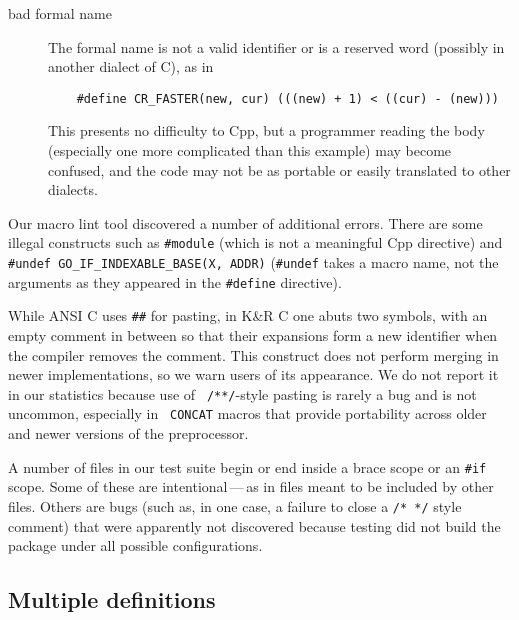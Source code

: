 \documentclass[10pt]{article}
\begin{document}
\begin{description}
\item[bad formal name]
        The formal name is not a valid identifier or is a reserved word
        (possibly in another dialect of C), as in
\begin{verbatim}
    #define CR_FASTER(new, cur) (((new) + 1) < ((cur) - (new)))
\end{verbatim}
        This presents no difficulty to Cpp, but a programmer reading the
        body (especially one more complicated than this example) may become
        confused, and the code may not be as portable or easily translated
        to other dialects. 

\end{description}


Our macro lint tool discovered a number of additional
errors.  There are some illegal constructs such as {\tt \#module} (which
is not a meaningful Cpp directive) and {\tt \#undef
\verb|GO_IF_INDEXABLE_BASE|(X, ADDR)} ({\tt \#undef} takes a macro name,
not the arguments as they appeared in the {\tt \#define} directive).
  
While ANSI C uses {\tt \#\#} for pasting, in K\&R C one abuts two symbols,
with an empty comment in between so that their expansions form a new
identifier when the compiler removes the comment.  This construct does not
perform merging in newer implementations, so we warn users of its
appearance.  We do not report it in our statistics because use of {\tt
/**/}-style pasting is rarely a bug and is not uncommon, especially in {\tt
CONCAT} macros that provide portability across older and newer versions of
the preprocessor.

A number of files in our test suite begin or end inside a brace scope or an
{\tt \#if} scope.  Some of these are intentional\,---\,as in files meant to
be included by other files.  Others are bugs (such as, in one case, a
failure to close a {\tt /* */} style comment) that were apparently not
discovered because testing did not build the package under all possible
configurations.



\subsection{Multiple definitions}
\label{sec:mult-def}
\end{document}
